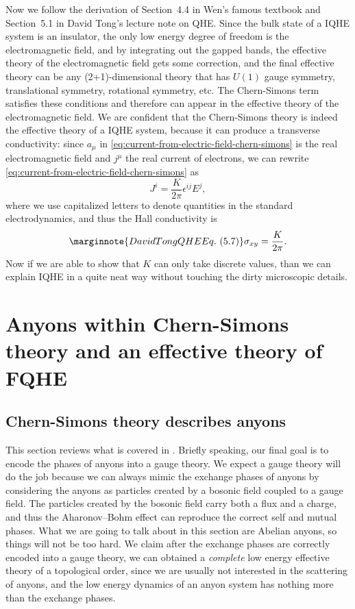\documentclass[hyperref, a4paper]{article}
\begin{document}
Now we follow the derivation of Section~4.4 in Wen's famous textbook and Section~5.1 in David Tong's lecture 
note on QHE. 
Since the bulk state of a IQHE system is an insulator, the only low energy degree of freedom is the electromagnetic 
field, and by integrating out the gapped bands, the effective theory of the electromagnetic field gets some 
correction, and the final effective theory can be any (2+1)-dimensional theory that has $U(1)$ gauge 
symmetry, translational symmetry, rotational symmetry, etc. The Chern-Simons term satisfies these 
conditions and therefore can appear in the effective theory of the electromagnetic field. We are 
confident that the Chern-Simons theory is indeed the effective theory of a IQHE system, because it 
can produce a transverse conductivity: since $a_\mu$ in \eqref{eq:current-from-electric-field-chern-simons} is 
the real electromagnetic field and $j^\mu$ the real current of electrons, we can rewrite 
\eqref{eq:current-from-electric-field-chern-simons} 
as 
\begin{equation}
    J^i = \frac{K}{2\pi} \epsilon^{ij} E^j,
    \label{eq:iqhe-eom}
\end{equation}
where we use capitalized letters to denote quantities in the standard electrodynamics,
and thus the Hall conductivity is 
\begin{equation} \marginnote{David Tong QHE Eq.~(5.7)}
    \sigma_{xy} = \frac{K}{2\pi}. 
\end{equation}
Now if we are able to show that $K$ can only take discrete values, than we can explain IQHE in a quite 
neat way without touching the dirty microscopic details.



\section{Anyons within Chern-Simons theory and an effective theory of FQHE}

\subsection{Chern-Simons theory describes anyons}

This section reviews what is covered in \cite{viefers_anyons}.
Briefly speaking, our final goal is to encode the phases of anyons into a gauge theory.
We expect a gauge theory will do the job because we can always mimic the exchange phases of anyons 
by considering the anyons as particles created by a bosonic field coupled to a gauge field.
The particles created by the bosonic field carry both a flux and a charge, 
and thus the Aharonov–Bohm effect can reproduce the correct self and mutual phases. 
What we are going to talk about in this section are Abelian anyons, so things will not be too hard.
We claim after the exchange phases are correctly encoded into a gauge theory, 
we can obtained a \emph{complete} low energy effective theory of a topological order,
since we are usually not interested in the scattering of anyons, and the low energy dynamics of an 
anyon system has nothing more than the exchange phases.
\end{document}
